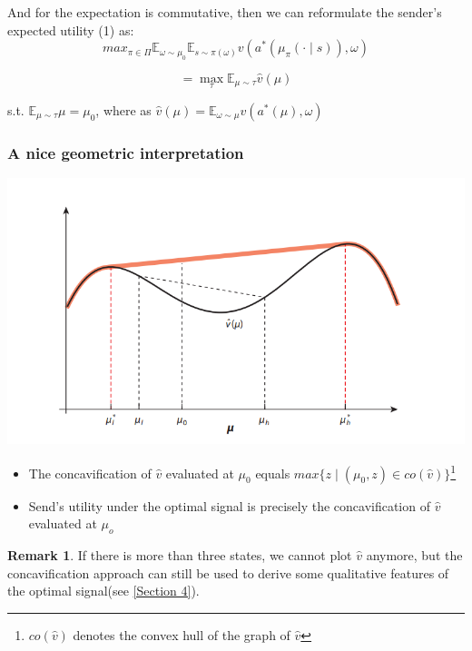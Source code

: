 \documentclass[12pt,letterpaper]{article}
\theoremstyle{definition}   %
\newtheorem*{remark}{Remark}    %
\begin{document}
And for the expectation is commutative, then we can reformulate the sender's expected utility (1) as:
\[max_{\pi \in \Pi} \mathbb{E}_{\omega \sim \mu_{0}} \mathbb{E}_{s \sim \pi(\omega)} v\left(a^{*}\left(\mu_{\pi}(\cdot \mid s)\right), \omega\right)\]

\begin{equation}
	= \max_{\tau} \mathbb{E}_{\mu \sim \tau} \hat{v}(\mu) 
\end{equation}

s.t. $\mathbb{E}_{\mu \sim \tau}  \mu = \mu_0$, where as $\hat{v}(\mu) = \mathbb{E}_{\omega \sim \mu} v(a^*(\mu), \omega)$

\subsubsection*{A nice geometric interpretation}

\includegraphics[scale=0.6]{concavification.png}

\begin{itemize}
	\item The concavification of $\hat{v}$ evaluated at $\mu_0$ equals $max\{z \mid (\mu_0, z) \in co(\hat{v})\}$\footnote{$co(\hat{v})$ denotes the convex hull of the graph of $\hat{v}$}
	\item Send's utility under the optimal signal is precisely the concavification of $\hat{v}$ evaluated at $\mu_o$
\end{itemize}

\begin{remark}
	If there is more than three states, we cannot plot $\hat{v}$ anymore, but the concavification approach can still be used to derive some qualitative features of the optimal signal(see \autoref{Section 4}).
\end{remark}
\end{document}

